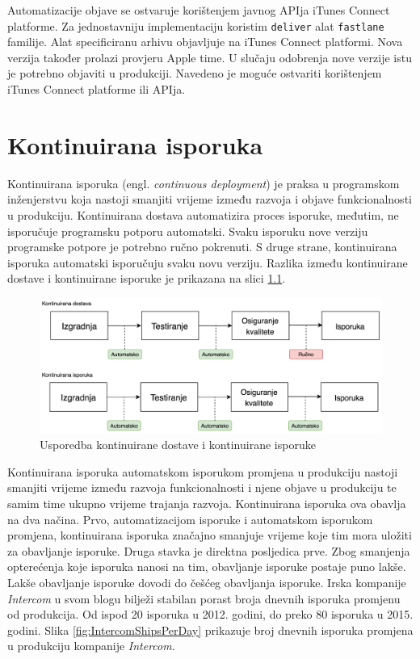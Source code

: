 \documentclass[times, utf8, diplomski, numeric]{fer}
\newcommand{\eng}[1]{(engl. \textit{#1})}
\begin{document}
Automatizacije objave se ostvaruje korištenjem javnog APIja iTunes Connect platforme. Za jednostavniju implementaciju koristim \verb|deliver| alat \verb|fastlane| familije. Alat specificiranu arhivu objavljuje na iTunes Connect platformi. Nova verzija također prolazi provjeru Apple time. U slučaju odobrenja nove verzije istu je potrebno objaviti u produkciji. Navedeno je moguće ostvariti korištenjem iTunes Connect platforme ili APIja.



\chapter{Kontinuirana isporuka} \label{header:KontinuiranaIsporuka}

Kontinuirana isporuka \eng{continuous deployment} je praksa u programskom inženjerstvu koja nastoji smanjiti vrijeme između razvoja i objave funkcionalnosti u produkciju. Kontinuirana dostava automatizira proces isporuke, međutim, ne isporučuje programsku potporu automatski. Svaku isporuku nove verziju programske potpore je potrebno ručno pokrenuti. S druge strane, kontinuirana isporuka automatski isporučuju svaku novu verziju. Razlika između kontinuirane dostave i kontinuirane isporuke je prikazana na slici \ref{fig:CDDifferences}\citep{cd:whats_the_diff}.

\begin{figure}
\centering
\includegraphics[scale=0.55]{CDDifferences}
\caption{Usporedba kontinuirane dostave i kontinuirane isporuke}
\label{fig:CDDifferences}
\end{figure}

Kontinuirana isporuka automatskom isporukom promjena u produkciju nastoji smanjiti vrijeme između razvoja funkcionalnosti i njene objave u produkciju te samim time ukupno vrijeme trajanja razvoja. Kontinuirana isporuka ova obavlja na dva načina. Prvo, automatizacijom isporuke i automatskom isporukom promjena, kontinuirana isporuka značajno smanjuje vrijeme koje tim mora uložiti za obavljanje isporuke. Druga stavka je direktna posljedica prve. Zbog smanjenja opterećenja koje isporuka nanosi na tim, obavljanje isporuke postaje puno lakše. Lakše obavljanje isporuke dovodi do češćeg obavljanja isporuke. Irska kompanije \textit{Intercom} u svom blogu bilježi stabilan porast broja dnevnih isporuka promjenu od produkcija. Od ispod 20 isporuka u 2012. godini, do preko 80 isporuka u 2015. godini. Slika \ref{fig:IntercomShipsPerDay} prikazuje broj dnevnih isporuka promjena u produkciju kompanije \textit{Intercom}\citep{intercom:cd}.
\end{document}
